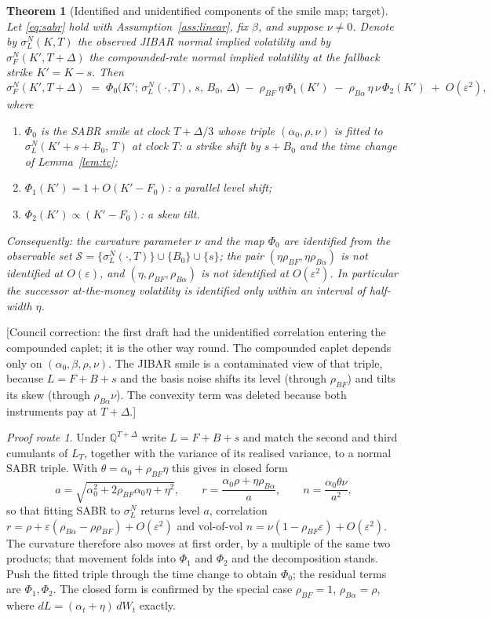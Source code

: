 \documentclass[11pt,a4paper]{article}
\newcommand{\corr}[1]{{\color{ox}\textsf{\small [Council correction: #1]}}}
\newcommand{\target}{{\color{teal}\textsf{\small target}}}
\theoremstyle{plain}
\newtheorem{theorem}{Theorem}
\theoremstyle{definition}
\theoremstyle{remark}
\newtheorem*{route}{Proof route}
\newcommand{\Q}{\mathbb{Q}}
\begin{document}
\begin{theorem}[Identified and unidentified components of the smile map; \target]\label{thm:ident}
Let \eqref{eq:sabr} hold with Assumption~\ref{ass:linear}, fix $\beta$, and suppose $\nu\neq0$. Denote by $\sigma^N_L(K,T)$ the observed JIBAR normal implied volatility and by $\sigma^N_F(K',T+\Delta)$ the compounded-rate normal implied volatility at the fallback strike $K'=K-s$. Then
\begin{equation}\label{eq:decomp}
\sigma^N_F(K',T+\Delta)\;=\;\Phi_0\big(K';\,\sigma^N_L(\cdot,T),\,s,\,B_0,\,\Delta\big)\;-\;\rho_{BF}\,\eta\,\Phi_1(K')\;-\;\rho_{B\alpha}\,\eta\,\nu\,\Phi_2(K')\;+\;O(\varepsilon^2),
\end{equation}
where
\begin{enumerate}[nosep]
\item $\Phi_0$ is the SABR smile at clock $T+\Delta/3$ whose triple $(\alpha_0,\rho,\nu)$ is fitted to $\sigma^N_L(K'+s+B_0,\,T)$ at clock $T$: a strike shift by $s+B_0$ and the time change of Lemma~\ref{lem:tc};
\item $\Phi_1(K')=1+O(K'-F_0)$: a parallel level shift;
\item $\Phi_2(K')\propto(K'-F_0)$: a skew tilt.
\end{enumerate}
Consequently: the curvature parameter $\nu$ and the map $\Phi_0$ are identified from the observable set $\mathcal S=\{\sigma^N_L(\cdot,T)\}\cup\{B_0\}\cup\{s\}$; the pair $(\eta\rho_{BF},\eta\rho_{B\alpha})$ is not identified at $O(\varepsilon)$, and $(\eta,\rho_{BF},\rho_{B\alpha})$ is not identified at $O(\varepsilon^2)$. In particular the successor at-the-money volatility is identified only within an interval of half-width $\eta$.
\end{theorem}
\corr{the first draft had the unidentified correlation entering the compounded caplet; it is the other way round. The compounded caplet depends only on $(\alpha_0,\beta,\rho,\nu)$. The JIBAR smile is a contaminated view of that triple, because $L=F+B+s$ and the basis noise shifts its level (through $\rho_{BF}$) and tilts its skew (through $\rho_{B\alpha}\nu$). The convexity term was deleted because both instruments pay at $T+\Delta$.}
\begin{route}
Under $\Q^{T+\Delta}$ write $L=F+B+s$ and match the second and third cumulants of $L_T$, together with the variance of its realised variance, to a normal SABR triple. With $\theta=\alpha_0+\rho_{BF}\eta$ this gives in closed form
\[
a=\sqrt{\alpha_0^2+2\rho_{BF}\alpha_0\eta+\eta^2},\qquad r=\frac{\alpha_0\rho+\eta\rho_{B\alpha}}{a},\qquad n=\frac{\alpha_0\theta\nu}{a^2},
\]
so that fitting SABR to $\sigma^N_L$ returns level $a$, correlation $r=\rho+\varepsilon(\rho_{B\alpha}-\rho\rho_{BF})+O(\varepsilon^2)$ and vol-of-vol $n=\nu(1-\rho_{BF}\varepsilon)+O(\varepsilon^2)$. The curvature therefore also moves at first order, by a multiple of the same two products; that movement folds into $\Phi_1$ and $\Phi_2$ and the decomposition stands. Push the fitted triple through the time change to obtain $\Phi_0$; the residual terms are $\Phi_1,\Phi_2$. The closed form is confirmed by the special case $\rho_{BF}=1$, $\rho_{B\alpha}=\rho$, where $dL=(\alpha_t+\eta)\,dW_t$ exactly.
\end{route}
\end{document}
